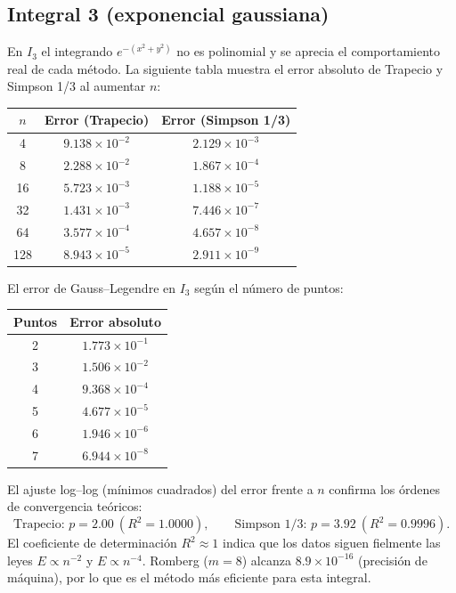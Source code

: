 \documentclass[12pt,a4paper]{article}
\begin{document}
\subsection{Integral 3 (exponencial gaussiana)}
En $I_3$ el integrando $e^{-(x^2+y^2)}$ no es polinomial y se aprecia el
comportamiento real de cada método. La siguiente tabla muestra el error
absoluto de Trapecio y Simpson 1/3 al aumentar $n$:

\begin{center}
\begin{tabular}{c c c}
\toprule
$n$ & Error (Trapecio) & Error (Simpson 1/3) \\
\midrule
4   & $9.138\times10^{-2}$ & $2.129\times10^{-3}$ \\
8   & $2.288\times10^{-2}$ & $1.867\times10^{-4}$ \\
16  & $5.723\times10^{-3}$ & $1.188\times10^{-5}$ \\
32  & $1.431\times10^{-3}$ & $7.446\times10^{-7}$ \\
64  & $3.577\times10^{-4}$ & $4.657\times10^{-8}$ \\
128 & $8.943\times10^{-5}$ & $2.911\times10^{-9}$ \\
\bottomrule
\end{tabular}
\end{center}

El error de Gauss--Legendre en $I_3$ según el número de puntos:

\begin{center}
\begin{tabular}{c c}
\toprule
Puntos & Error absoluto \\
\midrule
2 & $1.773\times10^{-1}$ \\
3 & $1.506\times10^{-2}$ \\
4 & $9.368\times10^{-4}$ \\
5 & $4.677\times10^{-5}$ \\
6 & $1.946\times10^{-6}$ \\
7 & $6.944\times10^{-8}$ \\
\bottomrule
\end{tabular}
\end{center}

El ajuste log--log (mínimos cuadrados) del error frente a $n$ confirma los
órdenes de convergencia teóricos:
\[
  \text{Trapecio: } p=2.00\ (R^2=1.0000),\qquad
  \text{Simpson 1/3: } p=3.92\ (R^2=0.9996).
\]
El coeficiente de determinación $R^2\approx1$ indica que los datos siguen
fielmente las leyes $E\propto n^{-2}$ y $E\propto n^{-4}$. Romberg ($m=8$)
alcanza $8.9\times10^{-16}$ (precisión de máquina), por lo que es el método
más eficiente para esta integral.
\end{document}
